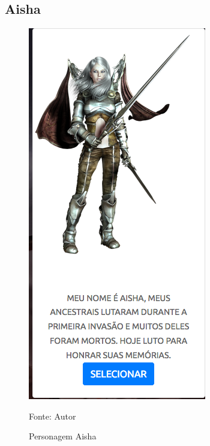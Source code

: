 \subsection{Aisha}
\begin{figure}[h]
	\centering
	\includegraphics[keepaspectratio=true,scale=0.5]{figuras/aisha.png}
	\caption{Personagem Aisha}
	Fonte: Autor
	\label{aisha}
\end{figure}

